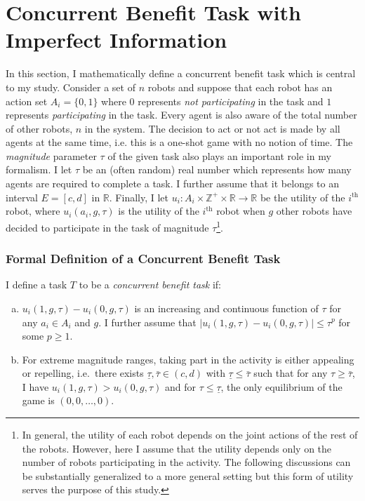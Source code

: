 \documentclass[defaultstyle,12pt]{proposal}
\def\Z{\mathbb{Z}}
\def\R{\mathbb{R}}
\begin{document}
\section{Concurrent Benefit Task with Imperfect Information}\label{sec:conbenefit}
In this section, I mathematically define a concurrent benefit task which is central to my study. Consider a set of $n$ robots and suppose that each robot has an action set $A_i=\{0,1\}$ where $0$ represents \emph{not participating} in the task and $1$ represents \emph{participating} in the task. Every agent is also aware of the total number of other robots, $n$ in the system. The decision to act or not act is made by all agents at the same time, i.e. this is a one-shot game with no notion of time. The \emph{magnitude} parameter $\tau$ of the given task also plays an important role in my formalism. I let $\tau$ be an (often random) real number which represents how many agents are required to complete a task. I further assume that it belongs to an interval $E=[c,d]$ in $\R$.  Finally, I let $u_i:A_i\times\Z^+\times \R\to \R$ be the utility of the $i^{\text{th}}$ robot, where $u_i(a_i,g,\tau)$ is the utility of the $i^{\text{th}}$ robot when $g$ other robots have decided to participate in the task of magnitude $\tau$\footnote{In general, the utility of each robot depends on the joint actions of the rest of the robots. However, here I assume that the utility depends only on the number of robots participating in the activity. The following discussions can be substantially generalized to a more general setting but this form of utility serves the purpose of this study.}. 

\subsubsection{Formal Definition of a Concurrent Benefit Task}\label{subsec:conbenefitdef}
I define a task $T$ to be a \emph{concurrent benefit task} if:
\begin{enumerate}[a.]
	\item $u_i(1,g,\tau)-u_i(0,g,\tau)$ is an increasing and continuous function of $\tau$ for any $a_i\in A_i$ and $g$. I further assume that $|u_i(1,g,\tau)-u_i(0,g,\tau)|\leq \tau^p$ for some $p\geq 1$. 
	\item For extreme magnitude ranges, taking part in the activity is either appealing or repelling, i.e.\ there exists $\underline{\tau},\bar{\tau}\in (c,d)$ with $\underline{\tau}\leq \bar{\tau}$ such that for any $\tau\geq \bar{\tau}$, I have $u_i(1,g,\tau)>u_i(0,g,\tau)$ and for $\tau\leq \underline{\tau}$, the only equilibrium of the game is $(0,0,\ldots,0)$. 
\end{enumerate}
\end{document}
